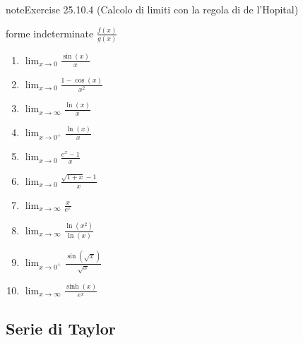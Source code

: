 \documentclass[letterpaper,10pt,italian]{jupyterBook}
\begin{document}
\begin{sphinxadmonition}{note}{Exercise 25.10.4 (Calcolo di limiti con la regola di de l’Hopital)}



\sphinxAtStartPar
forme indeterminate \(\frac{f(x)}{g(x)}\)
\begin{enumerate}
%
\item {} 
\sphinxAtStartPar
\(\lim_{x \to 0} \frac{\sin(x)}{x}\)

\item {} 
\sphinxAtStartPar
\(\lim_{x \to 0} \frac{1 - \cos(x)}{x^2}\)

\item {} 
\sphinxAtStartPar
\(\lim_{x \to \infty} \frac{\ln(x)}{x}\)

\item {} 
\sphinxAtStartPar
\(\lim_{x \to 0^+} \frac{\ln(x)}{x}\)

\item {} 
\sphinxAtStartPar
\(\lim_{x \to 0} \frac{e^x - 1}{x}\)

\item {} 
\sphinxAtStartPar
\(\lim_{x \to 0} \frac{\sqrt{1 + x} - 1}{x}\)

\item {} 
\sphinxAtStartPar
\(\lim_{x \to \infty} \frac{x}{e^x}\)

\item {} 
\sphinxAtStartPar
\(\lim_{x \to \infty} \frac{\ln(x^2)}{\ln(x)}\)

\item {} 
\sphinxAtStartPar
\(\lim_{x \to 0^+} \frac{\sin(\sqrt{x})}{\sqrt{x}}\)

\item {} 
\sphinxAtStartPar
\(\lim_{x \to \infty} \frac{\sinh(x)}{e^x}\)

\end{enumerate}
\end{sphinxadmonition}


\subsection{Serie di Taylor}
\label{\detokenize{ch/infinitesimal_calculus/derivatives-problems:serie-di-taylor}}\label{\detokenize{ch/infinitesimal_calculus/derivatives-problems:infinitesimal-calculus-derivatives-problems-taylor}} \label{exercise:ch/infinitesimal_calculus/derivatives-problems-exercise-4}
\end{document}
